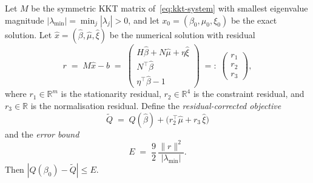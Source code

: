 \begin{lemma}%
\label{lem:q-error-bound}
Let $M$ be the symmetric KKT matrix
of~\eqref{eq:kkt-system}
with smallest eigenvalue magnitude
$|\lambda_{\min}| = \min_j |\lambda_j| > 0$,
and let $x_0 = (\beta_0, \mu_0, \xi_0)$ be the exact
solution.
Let $\hat x = (\hat\beta, \hat\mu, \hat\xi)$ be the
numerical solution with residual
\[
  r \;=\; M\hat x - b
  \;=\; \begin{pmatrix}
    H\hat\beta + N\hat\mu + \eta\hat\xi \\
    N^\top\hat\beta \\
    \eta^\top\hat\beta - 1
  \end{pmatrix}
  \;=:\; \begin{pmatrix}r_1 \\ r_2 \\ r_3\end{pmatrix},
\]
where $r_1 \in \mathbb{R}^m$ is the stationarity residual,
$r_2 \in \mathbb{R}^4$ is the constraint residual, and
$r_3 \in \mathbb{R}$ is the normalisation residual.
Define the \emph{residual-corrected objective}
\begin{equation}\label{eq:q-corrected}
  \tilde Q
  \;=\; Q(\hat\beta)
    + \bigl(r_2^\top\hat\mu + r_3\,\hat\xi\bigr)
\end{equation}
and the \emph{error bound}
\begin{equation}\label{eq:q-error-bound}
  E \;=\; \frac{9}{2}\,\frac{\|r\|^2}{|\lambda_{\min}|}.
\end{equation}
Then $|Q(\beta_0) - \tilde Q| \leq E$.
\end{lemma}

